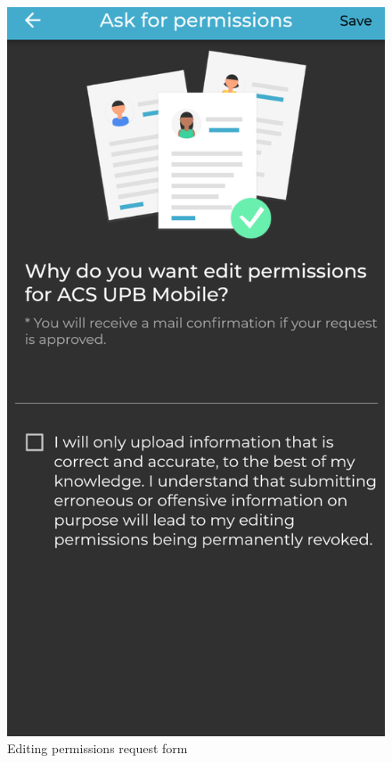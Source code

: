 \begin{figure}[!ht]
    \centering
    \begin{minipage}[b]{0.32\textwidth}
        \captionsetup{justification=centering}
        \includegraphics[width=\textwidth]{figures/app/final/request-editing-permissions.png}
        \caption{Editing permissions request form}

\end{minipage}
\end{figure}
